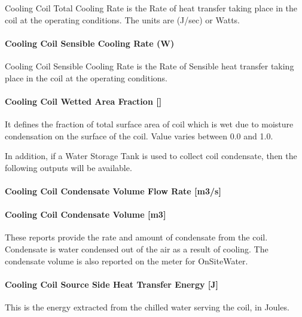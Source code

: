 Cooling Coil Total Cooling Rate is the Rate of heat transfer taking place in the coil at the operating conditions. The units are (J/sec) or Watts.

\paragraph{Cooling Coil Sensible Cooling Rate (W)}\label{cooling-coil-sensible-cooling-rate-w}

Cooling Coil Sensible Cooling Rate is the Rate of Sensible heat transfer taking place in the coil at the operating conditions.

\paragraph{Cooling Coil Wetted Area Fraction {[]}}\label{cooling-coil-wetted-area-fraction}

It defines the fraction of total surface area of coil which is wet due to moisture condensation on the surface of the coil. Value varies between 0.0 and 1.0.

In addition, if a Water Storage Tank is used to collect coil condensate, then the following outputs will be available.

\paragraph{Cooling Coil Condensate Volume Flow Rate {[}m3/s{]}}\label{cooling-coil-condensate-volume-flow-rate-m3s}

\paragraph{Cooling Coil Condensate Volume {[}m3{]}}\label{cooling-coil-condensate-volume-m3}

These reports provide the rate and amount of condensate from the coil. Condensate is water condensed out of the air as a result of cooling. The condensate volume is also reported on the meter for OnSiteWater.

\paragraph{Cooling Coil Source Side Heat Transfer Energy {[}J{]}}\label{cooling-coil-source-side-heat-transfer-energy-j}

This is the energy extracted from the chilled water serving the coil, in Joules.


